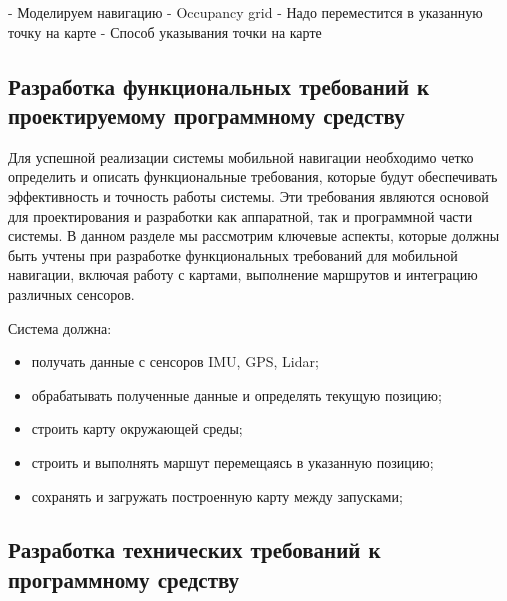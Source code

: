 {%
%

- Моделируем навигацию
- Occupancy grid
- Надо переместится в указанную точку на карте
- Способ указывания точки на карте


\subsection{Разработка функциональных требований к проектируемому программному
средству}
	Для успешной реализации системы мобильной навигации необходимо четко
	определить и описать функциональные требования, которые будут обеспечивать
	эффективность и точность работы системы. Эти требования являются основой для
	проектирования и разработки как аппаратной, так и программной части системы.
	В данном разделе мы рассмотрим ключевые аспекты, которые должны быть учтены
	при разработке функциональных требований для мобильной навигации, включая
	работу с картами, выполнение маршрутов и интеграцию различных сенсоров.

Система должна:
\begin{itemize}
	\item получать данные с сенсоров IMU, GPS, Lidar;
	\item обрабатывать полученные данные и определять текущую позицию;
	\item строить карту окружающей среды;
	\item строить и выполнять маршут перемещаясь в указанную позицию;
	\item сохранять и загружать построенную карту между запусками;
\end{itemize}

\subsection{Разработка технических требований к программному средству}

}
